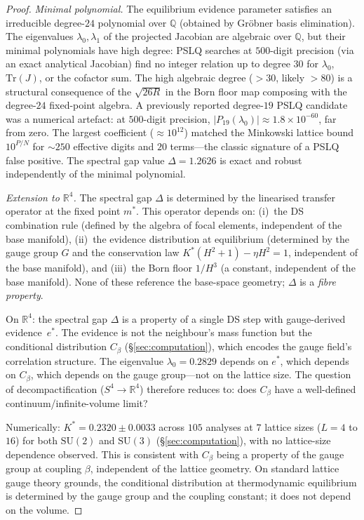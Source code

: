 \documentclass[11pt,a4paper]{article}
\theoremstyle{definition}
\theoremstyle{remark}
\newcommand{\R}{\mathbb{R}}
\newcommand{\SU}{\mathrm{SU}}
\begin{document}
\begin{proof}
\emph{Minimal polynomial.} The equilibrium evidence parameter satisfies an irreducible degree-$24$ polynomial over $\mathbb{Q}$ (obtained by Gr\"obner basis elimination). The eigenvalues $\lambda_0,\lambda_1$ of the projected Jacobian are algebraic over $\mathbb{Q}$, but their minimal polynomials have high degree: PSLQ searches at $500$-digit precision (via an exact analytical Jacobian) find no integer relation up to degree $30$ for $\lambda_0$, $\mathrm{Tr}(J)$, or the cofactor sum. The high algebraic degree ($>30$, likely $>80$) is a structural consequence of the $\sqrt{26R}$ in the Born floor map composing with the degree-$24$ fixed-point algebra. A previously reported degree-$19$ PSLQ candidate was a numerical artefact: at $500$-digit precision, $|P_{19}(\lambda_0)|\approx 1.8\times 10^{-60}$, far from zero. The largest coefficient ($\approx 10^{12}$) matched the Minkowski lattice bound $10^{P/N}$ for $\sim\!250$ effective digits and $20$ terms---the classic signature of a PSLQ false positive. The spectral gap value $\Delta=1.2626$ is exact and robust independently of the minimal polynomial.

\emph{Extension to $\R^4$.} The spectral gap $\Delta$ is determined by the linearised transfer operator at the fixed point $m^*$. This operator depends on: (i)~the DS combination rule (defined by the algebra of focal elements, independent of the base manifold), (ii)~the evidence distribution at equilibrium (determined by the gauge group $G$ and the conservation law $K^*(H^2+1)-\eta H^2=1$, independent of the base manifold), and (iii)~the Born floor $1/H^3$ (a constant, independent of the base manifold). None of these reference the base-space geometry; $\Delta$ is a \emph{fibre property}.

On $\R^4$: the spectral gap $\Delta$ is a property of a single DS step with gauge-derived evidence~$e^*$. The evidence is not the neighbour's mass function but the conditional distribution $C_\beta$ (\S\ref{sec:computation}), which encodes the gauge field's correlation structure. The eigenvalue $\lambda_0=0.2829$ depends on $e^*$, which depends on $C_\beta$, which depends on the gauge group---not on the lattice size. The question of decompactification ($S^4\to\R^4$) therefore reduces to: does $C_\beta$ have a well-defined continuum/infinite-volume limit?

Numerically: $K^*=0.2320\pm 0.0033$ across $105$ analyses at $7$ lattice sizes ($L=4$ to $16$) for both $\SU(2)$ and $\SU(3)$ (\S\ref{sec:computation}), with no lattice-size dependence observed. This is consistent with $C_\beta$ being a property of the gauge group at coupling $\beta$, independent of the lattice geometry. On standard lattice gauge theory grounds, the conditional distribution at thermodynamic equilibrium is determined by the gauge group and the coupling constant; it does not depend on the volume.


\end{proof}
\end{document}

